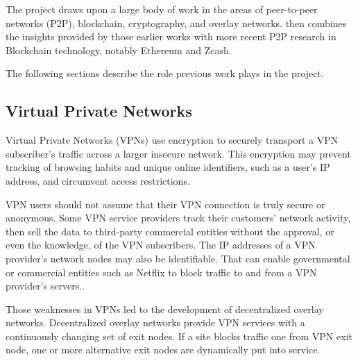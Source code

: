 The \orchid{} project draws upon a large body of work in the areas of peer-to-peer networks (P2P), blockchain, cryptography, and overlay networks. \orchid{} then combines the insights provided by those earlier works with more recent P2P research in Blockchain technology, notably Ethereum\cite{11} and Zcash\cite{12}.

The following sections describe the role previous work plays in the \orchid{} project.


\subsection{Virtual Private Networks}
Virtual Private Networks (VPNs) use encryption to securely transport a VPN subscriber's traffic across a larger insecure network. This encryption may prevent tracking of browsing habits and unique online identifiers, such as a user's IP address, and circumvent access restrictions.

VPN users should not assume that their VPN connection is truly secure or anonymous. Some VPN service providers track their customers' network activity, then sell the data to third-party commercial entities without the approval, or even the knowledge, of the VPN subscribers. The IP addresses of a VPN provider's network nodes may also be identifiable. That can enable governmental or commercial entities such as Netflix to block traffic to and from a VPN provider’s servers.\cite{13}.

Those weaknesses in VPNs led to the development of decentralized overlay networks. Decentralized overlay networks provide VPN services with a continuously changing set of exit nodes. If a site blocks traffic one from VPN exit node, one or more alternative exit nodes are dynamically put into service.


